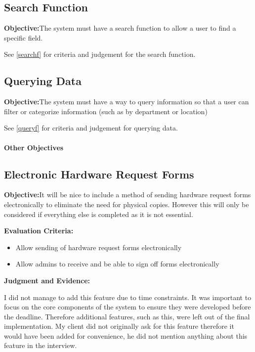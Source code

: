 \subsection{Search Function}

\textbf{Objective:}The system must have a search function to allow a user to find a specific field.

See \ref{searchf} for criteria and judgement for the search function.

\subsection{Querying Data}

\textbf{Objective:}The system must have a way to query information so that a user can filter or categorize information (such as by department or location)

See \ref{queryf} for criteria and judgement for querying data.



\paragraph{Other Objectives}

\subsection{Electronic Hardware Request Forms}

\textbf{Objective:}It will be nice to include a method of sending hardware request forms electronically to eliminate the need for physical copies. However this will only be considered if everything else is completed as it is not essential.

\textbf{Evaluation Criteria:}
\begin{itemize}
\item{Allow sending of hardware request forms electronically}
\item{Allow admins to receive and be able to sign off forms electronically}
\end{itemize}

\textbf{Judgment and Evidence:}

I did not manage to add this feature due to time constraints. It was important to focus on the core components of the system to ensure they were developed before the deadline. Therefore additional features, such as this, were left out of the final implementation. My client did not originally ask for this feature therefore it would have been added for convenience, he did not mention anything about this feature in the interview.


